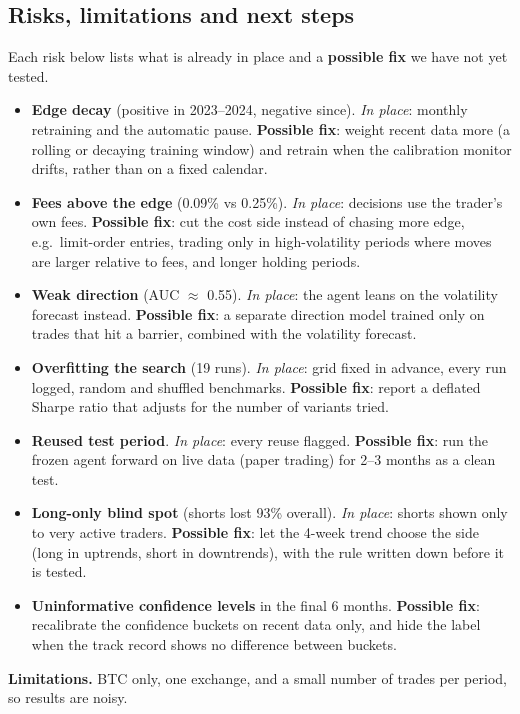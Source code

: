 \documentclass[10pt,a4paper]{article}
\begin{document}
\subsection{Risks, limitations and next steps}
Each risk below lists what is already in place and a \textbf{possible fix} we have not yet tested.
\begin{itemize}
  \item \textbf{Edge decay} (positive in 2023--2024, negative since). \emph{In place}: monthly retraining and the automatic pause.
        \textbf{Possible fix}: weight recent data more (a rolling or decaying training window) and retrain when the calibration
        monitor drifts, rather than on a fixed calendar.
  \item \textbf{Fees above the edge} (0.09\% vs 0.25\%). \emph{In place}: decisions use the trader's own fees.
        \textbf{Possible fix}: cut the cost side instead of chasing more edge, e.g.\ limit-order entries, trading only in
        high-volatility periods where moves are larger relative to fees, and longer holding periods.
  \item \textbf{Weak direction} (AUC $\approx$ 0.55). \emph{In place}: the agent leans on the volatility forecast instead.
        \textbf{Possible fix}: a separate direction model trained only on trades that hit a barrier, combined with the volatility
        forecast.
  \item \textbf{Overfitting the search} (19 runs). \emph{In place}: grid fixed in advance, every run logged, random and shuffled benchmarks.
        \textbf{Possible fix}: report a deflated Sharpe ratio that adjusts for the number of variants tried.
  \item \textbf{Reused test period}. \emph{In place}: every reuse flagged.
        \textbf{Possible fix}: run the frozen agent forward on live data (paper trading) for 2--3 months as a clean test.
  \item \textbf{Long-only blind spot} (shorts lost 93\% overall). \emph{In place}: shorts shown only to very active traders.
        \textbf{Possible fix}: let the 4-week trend choose the side (long in uptrends, short in downtrends), with the rule written
        down before it is tested.
  \item \textbf{Uninformative confidence levels} in the final 6 months. \textbf{Possible fix}: recalibrate the confidence buckets on
        recent data only, and hide the label when the track record shows no difference between buckets.
\end{itemize}
\textbf{Limitations.} BTC only, one exchange, and a small number of trades per period, so results are noisy.
\end{document}
